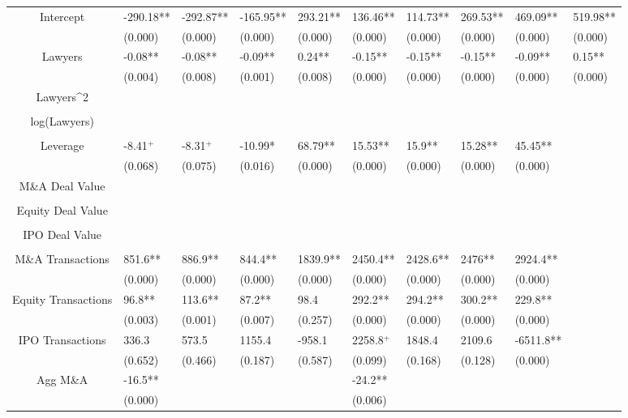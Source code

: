 \documentclass{article}
\begin{document}
\begin{table}[H]
\begin{tabular}{|clllllllll|}
Intercept & -290.18** & -292.87** & -165.95** & 293.21** & 136.46** & 114.73** & 269.53** & 469.09** & 519.98** \\ 
   & (0.000) & (0.000) & (0.000) & (0.000) & (0.000) & (0.000) & (0.000) & (0.000) & (0.000) \\ 
  Lawyers & -0.08** & -0.08** & -0.09** & 0.24** & -0.15** & -0.15** & -0.15** & -0.09** & 0.15** \\ 
   & (0.004) & (0.008) & (0.001) & (0.008) & (0.000) & (0.000) & (0.000) & (0.000) & (0.000) \\ 
  Lawyers^2 &  &  &  &  &  &  &  &  &  \\ 
   &  &  &  &  &  &  &  &  &  \\ 
  log(Lawyers) &  &  &  &  &  &  &  &  &  \\ 
   &  &  &  &  &  &  &  &  &  \\ 
  Leverage & -8.41$^{+}$ & -8.31$^{+}$ & -10.99* & 68.79** & 15.53** & 15.9** & 15.28** & 45.45** &  \\ 
   & (0.068) & (0.075) & (0.016) & (0.000) & (0.000) & (0.000) & (0.000) & (0.000) &  \\ 
  M\&A Deal Value &  &  &  &  &  &  &  &  &  \\ 
   &  &  &  &  &  &  &  &  &  \\ 
  Equity Deal Value &  &  &  &  &  &  &  &  &  \\ 
   &  &  &  &  &  &  &  &  &  \\ 
  IPO Deal Value &  &  &  &  &  &  &  &  &  \\ 
   &  &  &  &  &  &  &  &  &  \\ 
  M\&A Transactions & 851.6** & 886.9** & 844.4** & 1839.9** & 2450.4** & 2428.6** & 2476** & 2924.4** &  \\ 
   & (0.000) & (0.000) & (0.000) & (0.000) & (0.000) & (0.000) & (0.000) & (0.000) &  \\ 
  Equity Transactions & 96.8** & 113.6** & 87.2** & 98.4 & 292.2** & 294.2** & 300.2** & 229.8** &  \\ 
   & (0.003) & (0.001) & (0.007) & (0.257) & (0.000) & (0.000) & (0.000) & (0.000) &  \\ 
  IPO Transactions & 336.3 & 573.5 & 1155.4 & -958.1 & 2258.8$^{+}$ & 1848.4 & 2109.6 & -6511.8** &  \\ 
   & (0.652) & (0.466) & (0.187) & (0.587) & (0.099) & (0.168) & (0.128) & (0.000) &  \\ 
  Agg M\&A & -16.5** &  &  &  & -24.2** &  &  &  &  \\ 
   & (0.000) &  &  &  & (0.006) &  &  &  &  \\ 

\end{tabular}
\end{table}
\end{document}
